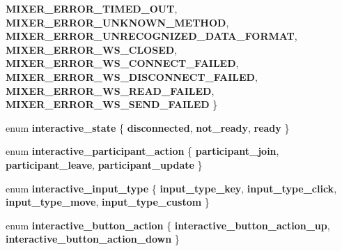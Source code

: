 \begin{DoxyCompactItemize}
{\bfseries M\+I\+X\+E\+R\+\_\+\+E\+R\+R\+O\+R\+\_\+\+T\+I\+M\+E\+D\+\_\+\+O\+UT}, 
{\bfseries M\+I\+X\+E\+R\+\_\+\+E\+R\+R\+O\+R\+\_\+\+U\+N\+K\+N\+O\+W\+N\+\_\+\+M\+E\+T\+H\+OD}, 
{\bfseries M\+I\+X\+E\+R\+\_\+\+E\+R\+R\+O\+R\+\_\+\+U\+N\+R\+E\+C\+O\+G\+N\+I\+Z\+E\+D\+\_\+\+D\+A\+T\+A\+\_\+\+F\+O\+R\+M\+AT}, 
\newline
{\bfseries M\+I\+X\+E\+R\+\_\+\+E\+R\+R\+O\+R\+\_\+\+W\+S\+\_\+\+C\+L\+O\+S\+ED}, 
{\bfseries M\+I\+X\+E\+R\+\_\+\+E\+R\+R\+O\+R\+\_\+\+W\+S\+\_\+\+C\+O\+N\+N\+E\+C\+T\+\_\+\+F\+A\+I\+L\+ED}, 
{\bfseries M\+I\+X\+E\+R\+\_\+\+E\+R\+R\+O\+R\+\_\+\+W\+S\+\_\+\+D\+I\+S\+C\+O\+N\+N\+E\+C\+T\+\_\+\+F\+A\+I\+L\+ED}, 
{\bfseries M\+I\+X\+E\+R\+\_\+\+E\+R\+R\+O\+R\+\_\+\+W\+S\+\_\+\+R\+E\+A\+D\+\_\+\+F\+A\+I\+L\+ED}, 
\newline
{\bfseries M\+I\+X\+E\+R\+\_\+\+E\+R\+R\+O\+R\+\_\+\+W\+S\+\_\+\+S\+E\+N\+D\+\_\+\+F\+A\+I\+L\+ED}
 \}
\item 
\mbox{\label{group__interactivity_gad7671629637b487b0ab1acb40a81fa82}} 
enum {\bfseries interactive\+\_\+state} \{ {\bfseries disconnected}, 
{\bfseries not\+\_\+ready}, 
{\bfseries ready}
 \}
\item 
\mbox{\label{group__interactivity_ga0de01cad238e1b3870f52a70a4ef0a94}} 
enum {\bfseries interactive\+\_\+participant\+\_\+action} \{ {\bfseries participant\+\_\+join}, 
{\bfseries participant\+\_\+leave}, 
{\bfseries participant\+\_\+update}
 \}
\item 
\mbox{\label{group__interactivity_gae2aaf8bdc60b4b126b354f9bf2c5f16a}} 
enum {\bfseries interactive\+\_\+input\+\_\+type} \{ {\bfseries input\+\_\+type\+\_\+key}, 
{\bfseries input\+\_\+type\+\_\+click}, 
{\bfseries input\+\_\+type\+\_\+move}, 
{\bfseries input\+\_\+type\+\_\+custom}
 \}
\item 
\mbox{\label{group__interactivity_ga1df1e232acffb35957e77dfa4008a8a8}} 
enum {\bfseries interactive\+\_\+button\+\_\+action} \{ {\bfseries interactive\+\_\+button\+\_\+action\+\_\+up}, 
{\bfseries interactive\+\_\+button\+\_\+action\+\_\+down}
 \}
\end{DoxyCompactItemize}
